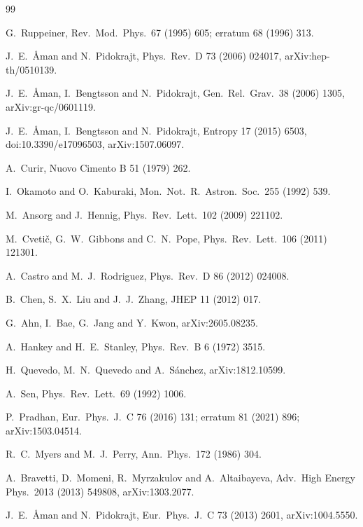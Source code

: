\documentclass[11pt]{article}
\theoremstyle{definition}
\theoremstyle{remark}
\begin{document}
\begin{thebibliography}{99}

 G.~Ruppeiner, Rev.\ Mod.\ Phys.\ 67 (1995) 605; erratum 68 (1996) 313.

 J.~E.~{\AA}man and N.~Pidokrajt, Phys.\ Rev.\ D 73 (2006) 024017, arXiv:hep-th/0510139.

 J.~E.~{\AA}man, I.~Bengtsson and N.~Pidokrajt, Gen.\ Rel.\ Grav.\ 38 (2006) 1305, arXiv:gr-qc/0601119.

 J.~E.~{\AA}man, I.~Bengtsson and N.~Pidokrajt, Entropy 17 (2015) 6503, doi:10.3390/e17096503, arXiv:1507.06097.

 A.~Curir, Nuovo Cimento B 51 (1979) 262.

 I.~Okamoto and O.~Kaburaki, Mon.\ Not.\ R.\ Astron.\ Soc.\ 255 (1992) 539.

 M.~Ansorg and J.~Hennig, Phys.\ Rev.\ Lett.\ 102 (2009) 221102.

 M.~Cveti\v{c}, G.~W.~Gibbons and C.~N.~Pope, Phys.\ Rev.\ Lett.\ 106 (2011) 121301.

 A.~Castro and M.~J.~Rodriguez, Phys.\ Rev.\ D 86 (2012) 024008.

 B.~Chen, S.~X.~Liu and J.~J.~Zhang, JHEP 11 (2012) 017.

 G.~Ahn, I.~Bae, G.~Jang and Y.~Kwon, arXiv:2605.08235.

 A.~Hankey and H.~E.~Stanley, Phys.\ Rev.\ B 6 (1972) 3515.

 H.~Quevedo, M.~N.~Quevedo and A.~S\'anchez, arXiv:1812.10599.

 A.~Sen, Phys.\ Rev.\ Lett.\ 69 (1992) 1006.

 P.~Pradhan, Eur.\ Phys.\ J.\ C 76 (2016) 131; erratum 81 (2021) 896; arXiv:1503.04514.

 R.~C.~Myers and M.~J.~Perry, Ann.\ Phys.\ 172 (1986) 304.

 A.~Bravetti, D.~Momeni, R.~Myrzakulov and A.~Altaibayeva, Adv.\ High Energy Phys.\ 2013 (2013) 549808, arXiv:1303.2077.

 J.~E.~{\AA}man and N.~Pidokrajt, Eur.\ Phys.\ J.\ C 73 (2013) 2601, arXiv:1004.5550.

\end{thebibliography}
\end{document}
